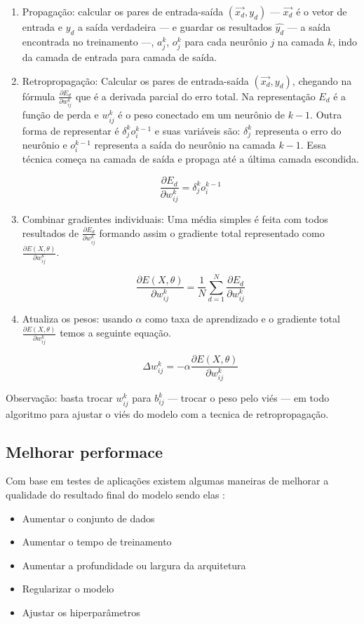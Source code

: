\begin{enumerate}
    \item Propagação: calcular os pares de entrada-saída $(\overrightarrow{x_d}, y_d)$ — $\overrightarrow{x_d}$ é o vetor de entrada e $y_d$ a saída verdadeira — e guardar os resultados $\hat{y_d}$ — a saída encontrada no treinamento —, $a_j^k$, $o_j^k$ para cada neurônio $j$ na camada $k$, indo da camada de entrada para camada de saída.
    
    \item Retropropagação: Calcular os pares de entrada-saída $(\overrightarrow{x_d}, y_d)$, chegando na fórmula $\frac{\partial{E_d}}{\partial{w_{ij}^k}}$ que é a derivada parcial do erro total. Na representação $E_d$ é a função de perda e $w_{ij}^k$ é o peso  conectado em um neurônio de $k - 1$. Outra forma de representar é $\delta_j^k o_i^{k - 1}$ e suas variáveis são: $\delta_j^k$ representa o erro do neurônio e $o_i^{k - 1}$ representa a saída do neurônio na camada $k -1$. Essa técnica começa na camada de saída e propaga até a última camada escondida.
    
    $$ \frac{\partial{E_d}}{\partial{w_{ij}^k}} = \delta_j^k o_i^{k - 1} $$
    
    \item Combinar gradientes individuais: Uma média simples é feita com todos resultados de $\frac{\partial{E_d}}{\partial{w_{ij}^k}}$ formando assim o gradiente total representado como $\frac{\partial{E(X, \theta)}}{\partial{w_{ij}^k}}$.
    
    $$ \frac{\partial{E(X,\theta)}}{\partial{w_{ij}^k}} = \frac{1}{N} \sum_{d=1}^{N} \frac{\partial{E_d}}{\partial{w_{ij}^k}} $$
    \item Atualiza os pesos: usando $\alpha$ como taxa de aprendizado e o gradiente total $\frac{\partial{E(X, \theta)}}{\partial{w_{ij}^k}}$ temos a seguinte equação.
    
    $$ \Delta w_{ij}^k = -\alpha \frac{\partial{E(X,\theta)}}{\partial{w_{ij}^k}} $$
\end{enumerate}

Observação: basta trocar $w_{ij}^k$ para $b_{ij}^k$ — trocar o peso pelo viés — em todo algoritmo para ajustar o viés do modelo com a tecnica de retropropagação.

\subsection*{Melhorar performace}

Com base em testes de aplicações existem algumas maneiras de melhorar a qualidade do resultado final do modelo sendo elas \cite{Alzubaidi2021}:

\begin{itemize}
    \item Aumentar o conjunto de dados
    \item Aumentar o tempo de treinamento
    \item Aumentar a profundidade ou largura da arquitetura
    \item Regularizar o modelo
    \item Ajustar os hiperparâmetros
\end{itemize}
    